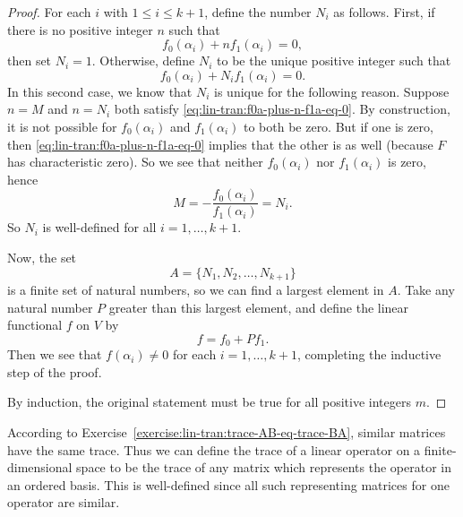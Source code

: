 \begin{proof}
  For each $i$ with $1\leq i\leq k+1$, define the number $N_i$ as
  follows. First, if there is no positive integer $n$ such that
  \begin{equation}
    \label{eq:lin-tran:f0a-plus-n-f1a-eq-0}
    f_0(\alpha_i) + nf_1(\alpha_i) = 0,
  \end{equation}
  then set $N_i = 1$. Otherwise, define $N_i$ to be the unique
  positive integer such that
  \begin{equation*}
    f_0(\alpha_i) + N_if_1(\alpha_i) = 0.
  \end{equation*}
  In this second case, we know that $N_i$ is unique for the following
  reason. Suppose $n = M$ and $n = N_i$ both satisfy
  \eqref{eq:lin-tran:f0a-plus-n-f1a-eq-0}. By construction, it is not
  possible for $f_0(\alpha_i)$ and $f_1(\alpha_i)$ to both be
  zero. But if one is zero, then
  \eqref{eq:lin-tran:f0a-plus-n-f1a-eq-0} implies that the other is as
  well (because $F$ has characteristic zero). So we see that neither
  $f_0(\alpha_i)$ nor $f_1(\alpha_i)$ is zero, hence
  \begin{equation*}
    M = -\frac{f_0(\alpha_i)}{f_1(\alpha_i)} = N_i.
  \end{equation*}
  So $N_i$ is well-defined for all $i = 1, \dots, k+1$.

  Now, the set
  \begin{equation*}
    A = \{N_1, N_2, \dots, N_{k+1}\}
  \end{equation*}
  is a finite set of natural numbers, so we can find a largest element
  in $A$. Take any natural number $P$ greater than this largest
  element, and define the linear functional $f$ on $V$ by
  \begin{equation*}
    f = f_0 + Pf_1.
  \end{equation*}
  Then we see that $f(\alpha_i)\neq0$ for each $i = 1,\dots,k+1$,
  completing the inductive step of the proof.

  By induction, the original statement must be true for all positive
  integers $m$.
\end{proof}

 According to
Exercise~\ref{exercise:lin-tran:trace-AB-eq-trace-BA}, similar
matrices have the same trace. Thus we can define the trace of a linear
operator on a finite-dimensional space to be the trace of any matrix
which represents the operator in an ordered basis. This is
well-defined since all such representing matrices for one operator are
similar.

